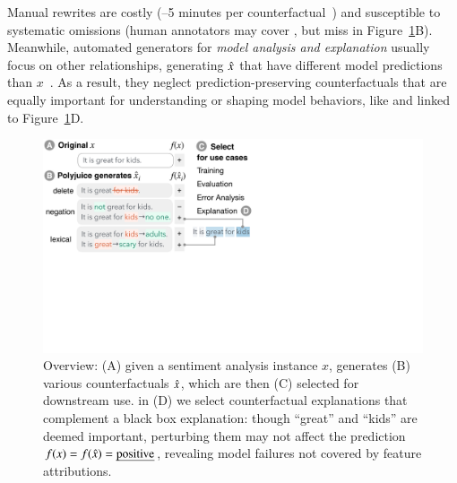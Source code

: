 Manual rewrites are costly (--5 minutes per counterfactual~\cite{kaushik2019learning}) and susceptible to systematic omissions (\eg human annotators may cover , but miss  in Figure~\ref{fig:teaser}B).
Meanwhile, automated generators for \emph{model analysis and explanation} usually focus on other relationships, \eg generating $\hat{x}$ that have different model predictions than $x$~\cite{ross2020explaining, Zhang2019GeneratingFA}. 
As a result, they neglect prediction-preserving counterfactuals that are equally important for understanding or shaping model behaviors, like  and  linked to Figure~\ref{fig:teaser}D.



\begin{figure}[t]
\centering
\includegraphics[trim={0 18cm 30.5cm 0cm},clip, width=1\columnwidth]{figures/teaser.pdf}
\vspace{-5pt}
\caption{
Overview: (A) given a sentiment analysis instance $x$, \sysname\footnotemark generates (B) various counterfactuals $\hat{x}$, which are then (C) selected for downstream use.
\eg in (D) we select counterfactual explanations that complement a black box explanation: though ``great'' and ``kids'' are deemed important, perturbing them may not affect the prediction $f(x)=f(\hat{x})=\text{\emph{positive}}$, revealing model failures not covered by feature attributions.
}
\vspace{-5pt}
\label{fig:teaser}
\end{figure} 


